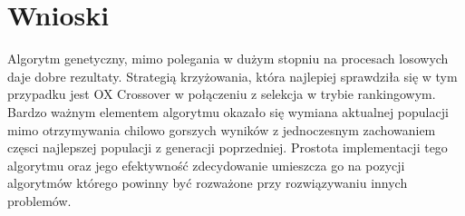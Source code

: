 \documentclass[polish,polish,a4paper]{article}
\begin{document}
\newpage

\newpage

\section{Wnioski}
\hspace{\parindent}
\par Algorytm genetyczny, mimo polegania w dużym stopniu na procesach losowych daje dobre rezultaty. Strategią krzyżowania, która najlepiej sprawdziła
się w tym przypadku jest OX Crossover w połączeniu z selekcja w trybie rankingowym. Bardzo ważnym elementem algorytmu okazało się wymiana aktualnej
populacji mimo otrzymywania chilowo gorszych wyników z jednoczesnym zachowaniem częsci najlepszej populacji z generacji poprzedniej. Prostota implementacji
tego algorytmu oraz jego efektywność zdecydowanie umieszcza go na pozycji algorytmów którego powinny być rozważone przy rozwiązywaniu innych problemów.



\end{document}
